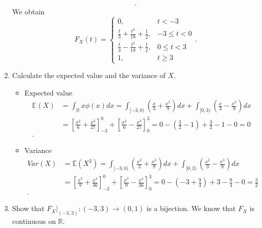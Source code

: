 \begin{exercise}[]
\begin{enumerate}[label=(\alph*), start=2]
\begin{align*}
            .\end{align*}
            We obtain
            \[
            F_X(t) = 
            \begin{cases}
                0, & t < -3 \\
                \frac{t}{3} + \frac{t^2}{18} + \frac{1}{2}, & -3 \le t <0 \\
                \frac{t}{3} - \frac{t^2}{18} +\frac{1}{2}, & 0 \le t<3 \\
                1, & t \ge 3
            \end{cases}
            .\] 
        \item Calculate the expected value and the variance of $X$.
             \begin{itemize}
                \item Expected value
                    \begin{align*}
                        \mathbb{E}(X) &= \int_{\mathbb{R}} x\phi(x) dx
                        = \int_{[-3,0)}\left( \frac{x}{3} + \frac{x^2}{9} \right) dx
                        + \int_{[0,3)}\left( \frac{x}{3} - \frac{x^2}{9} \right) dx\\
                        &= \left[ \frac{x^2}{6} + \frac{x^{3}}{27} \right]_{-3}^{0}  
                        +\left[ \frac{x^2}{6} - \frac{x^{3}}{27} \right]_{0}^{3}
                        = 0 - (\frac{3}{2} - 1) + \frac{3}{2} - 1 -0 =0\\
                    .\end{align*}
                \item Variance
                    \begin{align*}
                        Var(X) &= \mathbb{E}(X^{2})
                        = \int_{[-3,0)}\left( \frac{x^2}{3} + \frac{x^3}{9} \right) dx
                        + \int_{[0,3)}\left( \frac{x^2}{3} - \frac{x^3}{9} \right) dx\\
                        &= \left[ \frac{x^3}{9} + \frac{x^{4}}{36} \right]_{-3}^{0}  
                        +\left[ \frac{x^3}{9} - \frac{x^{4}}{36} \right]_{0}^{3}
                        = 0 - (-3 + \frac{9}{4}) + 3 - \frac{9}{4} -0 = \frac{3}{2}\\
                    .\end{align*}
            \end{itemize}
        \item Show that $F_X|_{(-3,3)}: (-3, 3) \to (0,1) $ is a bijection. We know that 
            $F_X $ is continuous on $\mathbb{R} $. 


\end{enumerate}
\end{exercise}

